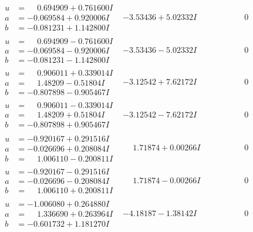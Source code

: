 \documentclass[1p]{elsarticle_modified}
\theoremstyle{definition}
\begin{document}
$$\begin{array}{c|c|c}
\begin{aligned}
u &= \phantom{-}0.694909 + 0.761600 I \\
a &= -0.069584 + 0.920006 I \\
b &= -0.081231 + 1.142800 I\end{aligned}
 & -3.53436 + 5.02332 I & \phantom{-0.000000 } 0 \\ \hline\begin{aligned}
u &= \phantom{-}0.694909 - 0.761600 I \\
a &= -0.069584 - 0.920006 I \\
b &= -0.081231 - 1.142800 I\end{aligned}
 & -3.53436 - 5.02332 I & \phantom{-0.000000 } 0 \\ \hline\begin{aligned}
u &= \phantom{-}0.906011 + 0.339014 I \\
a &= \phantom{-}1.48209 - 0.51804 I \\
b &= -0.807898 - 0.905467 I\end{aligned}
 & -3.12542 + 7.62172 I & \phantom{-0.000000 } 0 \\ \hline\begin{aligned}
u &= \phantom{-}0.906011 - 0.339014 I \\
a &= \phantom{-}1.48209 + 0.51804 I \\
b &= -0.807898 + 0.905467 I\end{aligned}
 & -3.12542 - 7.62172 I & \phantom{-0.000000 } 0 \\ \hline\begin{aligned}
u &= -0.920167 + 0.291516 I \\
a &= -0.026696 + 0.208084 I \\
b &= \phantom{-}1.006110 - 0.200811 I\end{aligned}
 & \phantom{-}1.71874 + 0.00266 I & \phantom{-0.000000 } 0 \\ \hline\begin{aligned}
u &= -0.920167 - 0.291516 I \\
a &= -0.026696 - 0.208084 I \\
b &= \phantom{-}1.006110 + 0.200811 I\end{aligned}
 & \phantom{-}1.71874 - 0.00266 I & \phantom{-0.000000 } 0 \\ \hline\begin{aligned}
u &= -1.006080 + 0.264880 I \\
a &= \phantom{-}1.336690 + 0.263964 I \\
b &= -0.601732 + 1.181270 I\end{aligned}
 & -4.18187 - 1.38142 I & \phantom{-0.000000 } 0 \\ \hline\begin{aligned}

\end{aligned}
\end{array}$$
\end{document}
